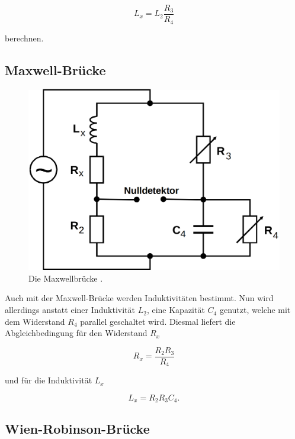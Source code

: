 \begin{equation}
    L_x = L_2 \frac{R_3}{R_4}
    \label{eqn:indl}
\end{equation}

berechnen.

\subsection{Maxwell-Brücke}

\begin{figure}
    \centering
    \includegraphics[scale=0.25]{content/Maxwellbruecke.png}
    \caption{Die Maxwellbrücke \cite[S. 222]{anleitung}.}
    \label{fig:maxwell}
\end{figure}

Auch mit der Maxwell-Brücke werden Induktivitäten bestimmt. 
Nun wird allerdings anstatt einer Induktivität $L_2$, eine Kapazität $C_4$ genutzt,
welche mit dem Widerstand $R_4$ parallel geschaltet wird. 
Diesmal liefert die Abgleichbedingung für den Widerstand $R_x$

\begin{equation}
    R_x = \frac{R_2 R_3}{R_4}
    \label{eqn:mw_r}
\end{equation}

und für die Induktivität $L_x$

\begin{equation}
    L_x = R_2 R_3 C_4 .
    \label{eqn:mw_l}
\end{equation}

\subsection{Wien-Robinson-Brücke}

